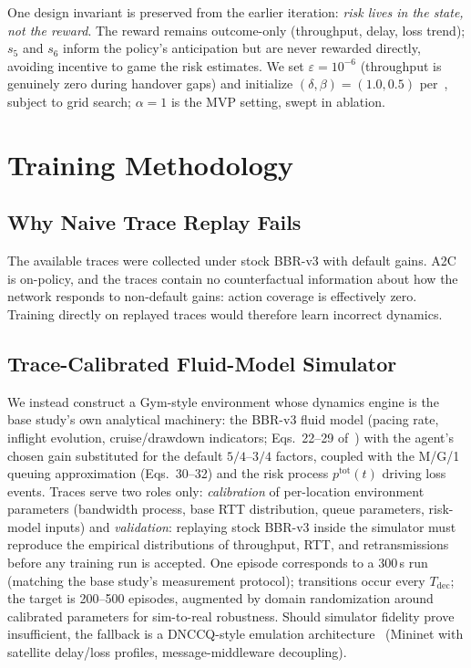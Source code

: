 \documentclass[journal]{IEEEtran}
\begin{document}
One design invariant is preserved from the earlier iteration: \emph{risk
lives in the state, not the reward}. The reward remains outcome-only
(throughput, delay, loss trend); $s_5$ and $s_6$ inform the policy's
anticipation but are never rewarded directly, avoiding incentive to game
the risk estimates. We set $\varepsilon=10^{-6}$ (throughput is genuinely
zero during handover gaps) and initialize $(\delta,\beta)=(1.0,0.5)$
per~\cite{yu2026dnccq}, subject to grid search; $\alpha{=}1$ is the MVP
setting, swept in ablation.

\section{Training Methodology}
\label{sec:training}

\subsection{Why Naive Trace Replay Fails}
The available traces were collected under stock BBR-v3 with default gains.
A2C is on-policy, and the traces contain no counterfactual information about
how the network responds to non-default gains: action coverage is
effectively zero. Training directly on replayed traces would therefore learn
incorrect dynamics.

\subsection{Trace-Calibrated Fluid-Model Simulator}
\label{sec:sim}
We instead construct a Gym-style environment whose dynamics engine is the
base study's own analytical machinery: the BBR-v3 fluid model (pacing rate,
inflight evolution, cruise/drawdown indicators; Eqs.~22--29
of~\cite{desilva2026tmc}) with the agent's chosen gain substituted for the
default $5/4$--$3/4$ factors, coupled with the M/G/1 queuing approximation
(Eqs.~30--32) and the risk process $p^{\mathrm{tot}}(t)$ driving loss
events. Traces serve two roles only: \emph{calibration} of per-location
environment parameters (bandwidth process, base RTT distribution, queue
parameters, risk-model inputs) and \emph{validation}: replaying stock
BBR-v3 inside the simulator must reproduce the empirical distributions of
throughput, RTT, and retransmissions before any training run is accepted.
One episode corresponds to a 300\,s run (matching the base study's
measurement protocol); transitions occur every $T_{\mathrm{dec}}$; the
target is 200--500 episodes, augmented by domain randomization around
calibrated parameters for sim-to-real robustness. Should simulator fidelity
prove insufficient, the fallback is a DNCCQ-style emulation
architecture~\cite{yu2026dnccq} (Mininet with satellite delay/loss profiles,
message-middleware decoupling).
\end{document}
